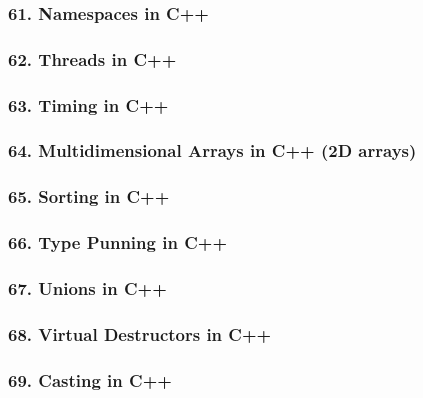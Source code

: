 \documentclass[11pt]{article}
\begin{document}
\hypertarget{namespaces-in-c}{%
\subsubsection{61. Namespaces in C++}\label{namespaces-in-c}}

\hypertarget{threads-in-c}{%
\subsubsection{62. Threads in C++}\label{threads-in-c}}

\hypertarget{timing-in-c}{%
\subsubsection{63. Timing in C++}\label{timing-in-c}}

\hypertarget{multidimensional-arrays-in-c-2d-arrays}{%
\subsubsection{64. Multidimensional Arrays in C++ (2D
arrays)}\label{multidimensional-arrays-in-c-2d-arrays}}

\hypertarget{sorting-in-c}{%
\subsubsection{65. Sorting in C++}\label{sorting-in-c}}

\hypertarget{type-punning-in-c}{%
\subsubsection{66. Type Punning in C++}\label{type-punning-in-c}}

\hypertarget{unions-in-c}{%
\subsubsection{67. Unions in C++}\label{unions-in-c}}

\hypertarget{virtual-destructors-in-c}{%
\subsubsection{68. Virtual Destructors in
C++}\label{virtual-destructors-in-c}}

\hypertarget{casting-in-c}{%
\subsubsection{69. Casting in C++}\label{casting-in-c}}
\end{document}
